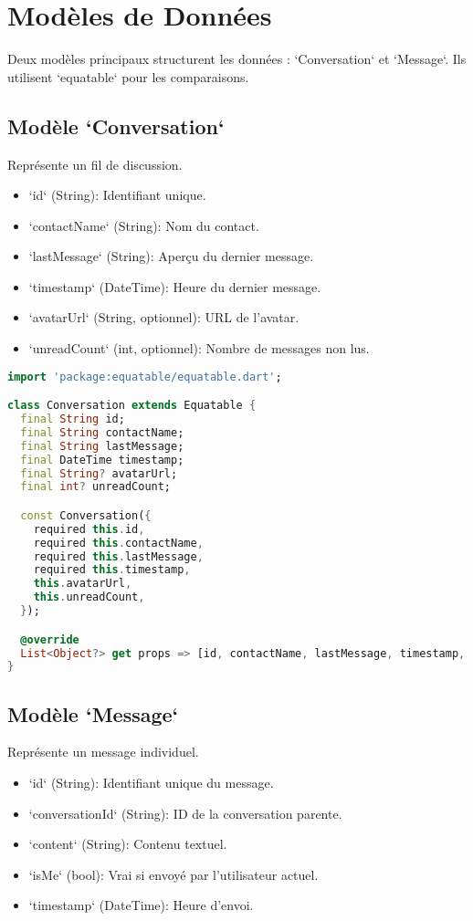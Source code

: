 \documentclass[12pt,a4paper]{article}
\begin{document}
\section{Modèles de Données}
Deux modèles principaux structurent les données : `Conversation` et `Message`. Ils utilisent `equatable` pour les comparaisons.

\subsection{Modèle `Conversation`}
Représente un fil de discussion.
\begin{itemize}
    \item `id` (String): Identifiant unique.
    \item `contactName` (String): Nom du contact.
    \item `lastMessage` (String): Aperçu du dernier message.
    \item `timestamp` (DateTime): Heure du dernier message.
    \item `avatarUrl` (String, optionnel): URL de l'avatar.
    \item `unreadCount` (int, optionnel): Nombre de messages non lus.
\end{itemize}

\begin{lstlisting}[language=Dart, caption=Modèle de données `Conversation` (`conversation_model.dart`), style=dartstyle]
import 'package:equatable/equatable.dart';

class Conversation extends Equatable {
  final String id;
  final String contactName;
  final String lastMessage;
  final DateTime timestamp;
  final String? avatarUrl;
  final int? unreadCount;

  const Conversation({
    required this.id,
    required this.contactName,
    required this.lastMessage,
    required this.timestamp,
    this.avatarUrl,
    this.unreadCount,
  });

  @override
  List<Object?> get props => [id, contactName, lastMessage, timestamp, avatarUrl, unreadCount];
}
\end{lstlisting}

\subsection{Modèle `Message`}
Représente un message individuel.
\begin{itemize}
    \item `id` (String): Identifiant unique du message.
    \item `conversationId` (String): ID de la conversation parente.
    \item `content` (String): Contenu textuel.
    \item `isMe` (bool): Vrai si envoyé par l'utilisateur actuel.
    \item `timestamp` (DateTime): Heure d'envoi.
\end{itemize}
\end{document}

